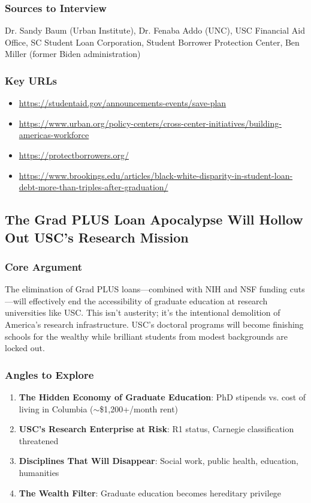 \documentclass[11pt,letterpaper]{article}
\begin{document}
\subsubsection*{Sources to Interview}
Dr. Sandy Baum (Urban Institute), Dr. Fenaba Addo (UNC), USC Financial Aid Office, SC Student Loan Corporation, Student Borrower Protection Center, Ben Miller (former Biden administration)

\subsubsection*{Key URLs}
\begin{itemize}[noitemsep]
    \item \url{https://studentaid.gov/announcements-events/save-plan}
    \item \url{https://www.urban.org/policy-centers/cross-center-initiatives/building-americas-workforce}
    \item \url{https://protectborrowers.org/}
    \item \url{https://www.brookings.edu/articles/black-white-disparity-in-student-loan-debt-more-than-triples-after-graduation/}
\end{itemize}

\newpage
\subsection{The Grad PLUS Loan Apocalypse Will Hollow Out USC's Research Mission}

\subsubsection*{Core Argument}
The elimination of Grad PLUS loans---combined with NIH and NSF funding cuts---will effectively end the accessibility of graduate education at research universities like USC. This isn't austerity; it's the intentional demolition of America's research infrastructure. USC's doctoral programs will become finishing schools for the wealthy while brilliant students from modest backgrounds are locked out.

\subsubsection*{Angles to Explore}
\begin{enumerate}[noitemsep]
    \item \textbf{The Hidden Economy of Graduate Education}: PhD stipends vs. cost of living in Columbia ($\sim$\$1,200+/month rent)
    \item \textbf{USC's Research Enterprise at Risk}: R1 status, Carnegie classification threatened
    \item \textbf{Disciplines That Will Disappear}: Social work, public health, education, humanities
    \item \textbf{The Wealth Filter}: Graduate education becomes hereditary privilege
\end{enumerate}
\end{document}
